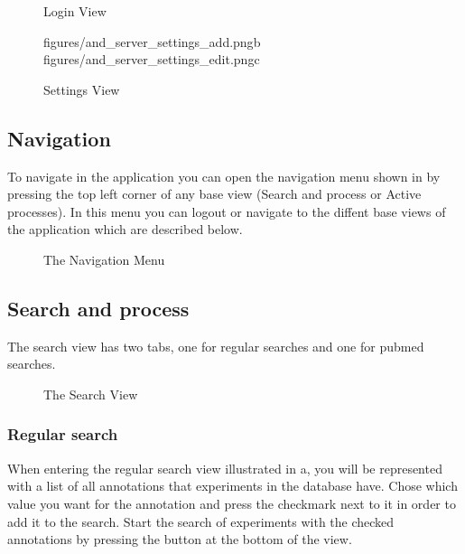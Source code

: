 \begin{figure}[h]
\caption{Login View}
\label{fig:and_login_man}
\end{figure}
\FloatBarrier

\begin{figure}[h]
		{figures/and_server_settings_add.png}{b}
		{figures/and_server_settings_edit.png}{c}
\caption{Settings View}
\label{fig:and_settings_man}
\end{figure}
\FloatBarrier

\subsection{Navigation}
To navigate in the application you can open the navigation menu shown in  by pressing the top left corner of any base view (Search and process or Active processes). In this menu you can logout or navigate to the diffent base views of the application which are described below.

\begin{figure}[h]
\caption{The Navigation Menu}
\label{fig:and_main_nav}
\end{figure}
\FloatBarrier

\subsection{Search and process}\label{sec:and_search}
The search view has two tabs, one for regular searches and one for pubmed searches.
\begin{figure}[h]
\caption{The Search View}
\label{fig:and_search_man}
\end{figure}
\FloatBarrier

\subsubsection{Regular search}
When entering the regular search view illustrated in a, you will be represented with a list of all
annotations that experiments in the database have. Chose which value you want for the annotation and press the checkmark next to it in order to add it to the search. Start the search of experiments with the checked annotations by pressing the  button at the bottom of the view.

